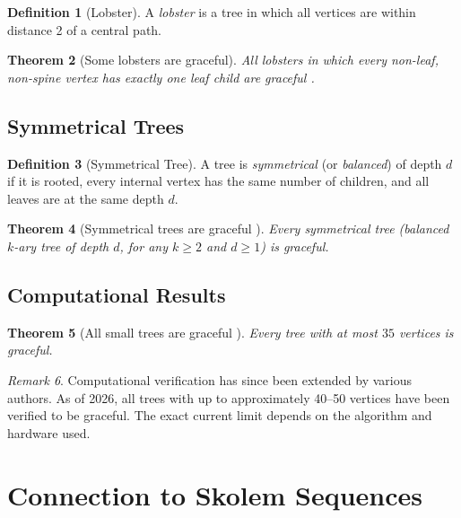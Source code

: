 \documentclass[12pt,a4paper]{amsart}
\newtheorem{theorem}{Theorem}[section]
\theoremstyle{definition}
\newtheorem{definition}[theorem]{Definition}
\theoremstyle{remark}
\newtheorem{remark}[theorem]{Remark}
\begin{document}
\begin{definition}[Lobster]
A \emph{lobster} is a tree in which all vertices are within distance 2 of a
central path.
\end{definition}

\begin{theorem}[Some lobsters are graceful]\label{thm:lobsters}
All lobsters in which every non-leaf, non-spine vertex has exactly one leaf child
are graceful \cite{Huang1994}.
\end{theorem}

\subsection{Symmetrical Trees}

\begin{definition}[Symmetrical Tree]
A tree is \emph{symmetrical} (or \emph{balanced}) of depth $d$ if it is rooted,
every internal vertex has the same number of children, and all leaves are at the
same depth $d$.
\end{definition}

\begin{theorem}[Symmetrical trees are graceful \cite{Cahit1980}]\label{thm:sym_trees}
Every symmetrical tree (balanced $k$-ary tree of depth $d$, for any $k \geq 2$
and $d \geq 1$) is graceful.
\end{theorem}

\subsection{Computational Results}

\begin{theorem}[All small trees are graceful \cite{HeadWilson2003}]\label{thm:small}
Every tree with at most $35$ vertices is graceful.
\end{theorem}

\begin{remark}
Computational verification has since been extended by various authors. As of 2026,
all trees with up to approximately 40--50 vertices have been verified to be graceful.
The exact current limit depends on the algorithm and hardware used.
\end{remark}

\section{Connection to Skolem Sequences}\label{sec:skolem}
\end{document}
